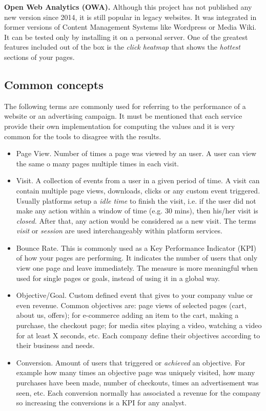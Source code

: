 \documentclass[preprint,12pt,3p]{elsarticle}
\begin{document}
\textbf{Open Web Analytics (OWA).}
Although this project has not published any new version since 2014, it is still popular in legacy websites. It was integrated in former versions of Content Management Systems like Wordpress or Media Wiki. It can be tested only by installing it on a personal server. One of the greatest features included out of the box is the \textit{click heatmap} that shows the \textit{hottest} sections of your pages.

\subsection{Common concepts}
The following terms are commonly used for referring to the performance of a website or an advertising campaign. It must be mentioned that each service provide their own implementation for computing the values and it is very common for the tools to disagree with the results.

\begin{itemize}
  \item Page View. Number of times a page was viewed by an user. A user can view the same o many pages multiple times in each visit.
  \item Visit. A collection of events from a user in a given period of time. A visit can contain multiple page views, downloads, clicks or any custom event triggered. Usually platforms setup a \textit{idle time} to finish the visit, i.e. if the user did not make any action within a window of time (e.g. 30 mins), then his/her visit is \textit{closed.} After that, any action would be considered as a new visit. The terms \textit{visit} or \textit{session} are used interchangeably within platform services.
  \item Bounce Rate. This is commonly used as a Key Performance Indicator (KPI) of how your pages are performing. It indicates the number of users that only view one page and leave immediately. The measure is more meaningful when used for single pages or goals, instead of using it in a global way.
  \item Objective/Goal. Custom defined event that gives to your company value or even revenue. Common objectives are: page views of selected pages (cart, about us, offers); for e-commerce adding an item to the cart, making a purchase, the checkout page; for media sites playing a video, watching a video for at least X seconds, etc. Each company define their objectives according to their business and needs.
  \item Conversion. Amount of users that triggered or \textit{achieved} an objective. For example how many times an objective page was uniquely visited, how many purchases have been made, number of checkouts, times an advertisement was seen, etc. Each conversion normally has associated a revenue for the company so increasing the conversions is a KPI for any analyst.
\end{itemize}
\end{document}
